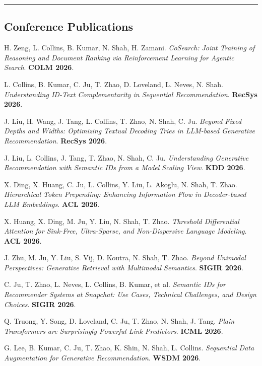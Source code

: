 \documentclass{article}
\newcommand{\HRule}{\rule{\linewidth}{0.5mm}}
\begin{document}
\vspace{-5mm}\HRule

\subsection*{\bf {Conference Publications}}

\begin{etaremune}[itemsep=1pt,parsep=0pt]
\item H. Zeng, L. Collins, B. Kumar, N. Shah, H. Zamani. \emph{CoSearch: Joint Training of Reasoning and Document Ranking via Reinforcement Learning for Agentic Search}. \textbf{COLM 2026}.
\item L. Collins, B. Kumar, C. Ju, T. Zhao, D. Loveland, L. Neves, N. Shah. \emph{Understanding ID-Text Complementarity in Sequential Recommendation}. \textbf{RecSys 2026}.
\item J. Liu, H. Wang, J. Tang, L. Collins, T. Zhao, N. Shah, C. Ju. \emph{Beyond Fixed Depths and Widths: Optimizing Textual Decoding Tries in LLM-based Generative Recommendation}. \textbf{RecSys 2026}.
\item J. Liu, L. Collins, J. Tang, T. Zhao, N. Shah, C. Ju. \emph{Understanding Generative Recommendation with Semantic IDs from a Model Scaling View}. \textbf{KDD 2026}.
\item X. Ding, X. Huang, C. Ju, L. Collins, Y. Liu, L. Akoglu, N. Shah, T. Zhao. \emph{Hierarchical Token Prepending: Enhancing Information Flow in Decoder-based LLM Embeddings}. \textbf{ACL 2026}.
\item X. Huang, X. Ding, M. Ju, Y. Liu, N. Shah, T. Zhao. \emph{Threshold Differential Attention for Sink-Free, Ultra-Sparse, and Non-Dispersive Language Modeling}. \textbf{ACL 2026}.
\item J. Zhu, M. Ju, Y. Liu, S. Vij, D. Koutra, N. Shah, T. Zhao. \emph{Beyond Unimodal Perspectives: Generative Retrieval with Multimodal Semantics}. \textbf{SIGIR 2026}.
\item C. Ju, T. Zhao, L. Neves, L. Collins, B. Kumar, et al. \emph{Semantic IDs for Recommender Systems at Snapchat: Use Cases, Technical Challenges, and Design Choices}. \textbf{SIGIR 2026}.
\item Q. Truong, Y. Song, D. Loveland, C. Ju, T. Zhao, N. Shah, J. Tang. \emph{Plain Transformers are Surprisingly Powerful Link Predictors}. \textbf{ICML 2026}.
\item G. Lee, B. Kumar, C. Ju, T. Zhao, K. Shin, N. Shah, L. Collins. \emph{Sequential Data Augmentation for Generative Recommendation}. \textbf{WSDM 2026}.

\end{etaremune}
\end{document}
